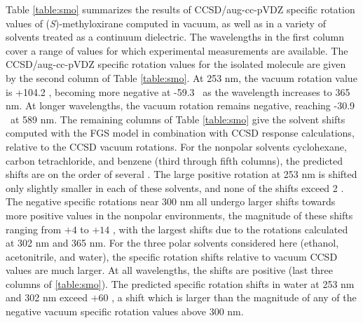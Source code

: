 Table \ref{table:smo} summarizes the results of CCSD/aug-cc-pVDZ specific
rotation values of (\emph{S})-methyloxirane computed in vacuum, as well
as in a variety of solvents treated as a continuum dielectric. The wavelengths
in the first column cover a range of values for which experimental measurements
are available. The CCSD/aug-cc-pVDZ specific rotation values for the isolated
molecule are given by the second column of Table \ref{table:smo}. At 253
nm, the vacuum rotation value is +104.2 \rotunits, becoming more negative
at -59.3 \rotunits \ as the wavelength increases to 365 nm. At longer wavelengths,
the vacuum rotation remains negative, reaching -30.9 \rotunits \ at 589 nm.
The remaining columns of Table \ref{table:smo} give the  solvent shifts computed
with the FGS model in combination with CCSD response calculations, relative
to the CCSD vacuum rotations. For the nonpolar solvents cyclohexane, carbon
tetrachloride, and benzene (third through fifth columns), the predicted
shifts are on the order of several \rotunits. The large positive rotation
at 253 nm is shifted only slightly smaller in each of these solvents, and none of
the shifts exceed 2 \rotunits. The negative specific rotations near 300 nm
all undergo larger shifts towards more positive values in the nonpolar environments, the magnitude of these shifts ranging from $+4$ to $+14$ \rotunits, with the
largest shifts due to the rotations calculated at 302 nm and 365 nm.
For the three polar solvents considered here (ethanol, acetonitrile, and water),
the specific rotation shifts relative to vacuum CCSD values are much larger.
At all wavelengths, the shifts are positive (last three columns of \ref{table:smo}). The predicted specific rotation shifts in water at
253 nm and 302 nm
exceed $+60$ \rotunits, a shift which is larger than the magnitude of any
of the negative vacuum specific rotation values above 300 nm.



